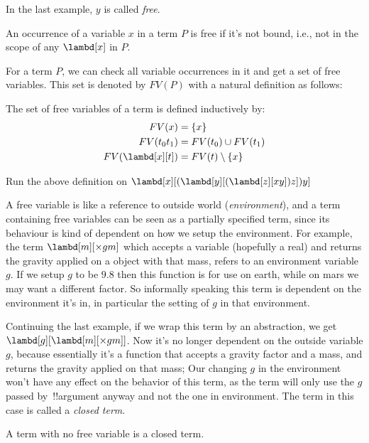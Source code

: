 \documentclass[../../../include/open-logic-section]{subfiles}
\begin{document}
In the last example, $y$ is called \emph{free}. 
\begin{defn}
  An occurrence of a variable $x$ in a term $P$ is free if it's not bound, i.e., not in the scope of any
  $\lambd[x]$ in $P$.
\end{defn}


For a term $P$, we can check all variable occurrences in it and get a set of free
variables. This set is denoted by $FV(P)$ with a natural definition
as follows:

\begin{defn}
  The set of free variables of a term is defined inductively by:
  \begin{align} 
     FV(x) &= \{x\} \label{eq:1} \\
     FV(t_0 t_1) &= FV(t_0) \cup FV(t_1) \label{eq:2} \\
    FV(\lambd[x][t]) &= FV(t) \setminus \{x\}     \label{eq:3} 
  \end{align}
\end{defn}

\begin{prob}
  Run the above definition on $\lambd[x][(\lambd[y][(\lambd[z][x y]) z]) y]$
\end{prob}

A free variable is like a reference to outside world (\emph{environment}), and a term
containing free variables can be seen as a partially specified term,
since its behaviour is kind of dependent on how we setup the
environment. For example, the term $\lambd[m][\times g m]$ which
accepts a variable (hopefully a real) and returns the gravity applied
on a object with that mass, refers to an environment variable $g$. If we
setup $g$ to be $9.8$  then this function is for use on earth,
while on mars we may want a different factor.
So informally speaking this term is dependent on the environment
it's in, in particular the setting of $g$ in that environment.

Continuing the last example, if we wrap this term by an abstraction, we get
$\lambd[g][\lambd[m][\times g m]]$. Now it's no longer dependent on
the outside variable $g$, because essentially it's a function that
accepts a gravity factor and a mass, and returns the gravity applied
on that mass; Our changing $g$ in the environment won't have any
effect on the behavior of this term, as the term will only use the $g$
passed by~!!{argument} anyway and not the one in environment. The term
in this case is called a \emph{closed term}.

\begin{defn}
  A term with no free variable is a closed term.
\end{defn}
\end{document}
